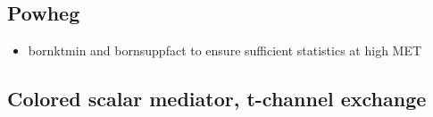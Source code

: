 



\subsection{Powheg}

\begin{itemize}
\item bornktmin and bornsuppfact to ensure sufficient statistics at high MET
\end{itemize}


%




\subsection{Colored scalar mediator, t-channel exchange}



